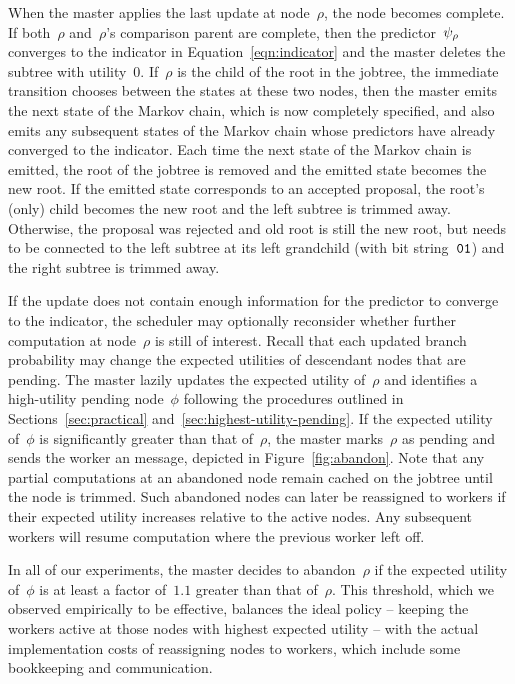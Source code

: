 \documentclass[angelino.tex]{subfiles}
\begin{document}
When the master applies the last update at node~$\rho$, the node becomes complete.
If both~$\rho$ and~$\rho$'s comparison parent are complete,
then the predictor~$\psi_{\rho}$ converges to the indicator in
Equation~\ref{eqn:indicator} and the master deletes the subtree with utility~$0$.
If~$\rho$ is the child of the root in the jobtree,
\ie the immediate transition chooses between the states at these two nodes,
then the master emits the next state of the Markov chain, which is now
completely specified, and also emits any subsequent states of the Markov chain
whose predictors have already converged to the indicator.
Each time the next state of the Markov chain is emitted,
the root of the jobtree is removed and the emitted state becomes the new root.
If the emitted state corresponds to an accepted proposal,
the root's (only) child becomes the new root and the left subtree is trimmed away.
Otherwise, the proposal was rejected and old root is still the new root,
but needs to be connected to the left subtree at its left grandchild
(with bit string~$\texttt{01}$) and the right subtree is trimmed away.

If the update does not contain enough information for the predictor to converge
to the indicator, the scheduler may optionally reconsider whether further
computation at node~$\rho$ is still of interest.
Recall that each updated branch probability may change the expected utilities
of descendant nodes that are pending.
The master lazily updates the expected utility of~$\rho$ and identifies a
high-utility pending node~$\phi$ following the procedures outlined in
Sections~\ref{sec:practical} and~\ref{sec:highest-utility-pending}.
If the expected utility of~$\phi$ is significantly
greater than that of~$\rho$, the master marks~$\rho$ as pending and
sends the worker an \ABANDON message, depicted in Figure~\ref{fig:abandon}.
%
Note that any partial computations at an abandoned node remain cached on the
jobtree until the node is trimmed.
Such abandoned nodes can later be reassigned to workers if their expected
utility increases relative to the active nodes.
Any subsequent workers will resume computation where the previous worker left off.

In all of our experiments, the master decides to abandon~$\rho$ if the
expected utility of~$\phi$ is at least a factor of~$1.1$ greater than that of~$\rho$.
This threshold, which we observed empirically to be effective, balances the
ideal policy -- keeping the workers active at those nodes with highest expected
utility -- with the actual implementation costs of reassigning nodes to workers,
which include some bookkeeping and communication.
\end{document}
